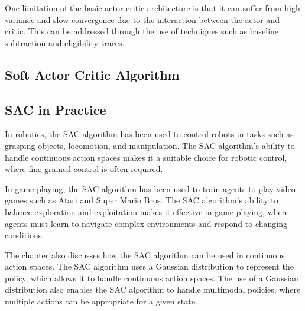 One limitation of the basic actor-critic architecture is that it can suffer from high variance and slow convergence due to the interaction between the actor and critic. This can be addressed through the use of techniques such as baseline subtraction and eligibility traces.

\subsection{Soft Actor Critic Algorithm}




\subsection{SAC in Practice}


In robotics, the SAC algorithm has been used to control robots in tasks such as grasping objects, locomotion, and manipulation. The SAC algorithm's ability to handle continuous action spaces makes it a suitable choice for robotic control, where fine-grained control is often required.

In game playing, the SAC algorithm has been used to train agents to play video games such as Atari and Super Mario Bros. The SAC algorithm's ability to balance exploration and exploitation makes it effective in game playing, where agents must learn to navigate complex environments and respond to changing conditions.

The chapter also discusses how the SAC algorithm can be used in continuous action spaces. The SAC algorithm uses a Gaussian distribution to represent the policy, which allows it to handle continuous action spaces. The use of a Gaussian distribution also enables the SAC algorithm to handle multimodal policies, where multiple actions can be appropriate for a given state.

